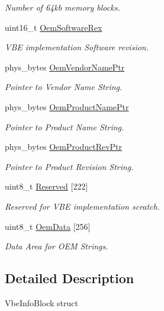 \begin{DoxyCompactItemize}
\begin{DoxyCompactList}\small\item\em Number of 64kb memory blocks. \end{DoxyCompactList}\item 
uint16\+\_\+t \hyperlink{structvbe__info__block__t_a050873b740536c3f9c9a9b0ecb76b497}{Oem\+Software\+Rex}
\begin{DoxyCompactList}\small\item\em V\+BE implementation Software revision. \end{DoxyCompactList}\item 
phys\+\_\+bytes \hyperlink{structvbe__info__block__t_affd3a330afde841405f89bbcd05af4f0}{Oem\+Vendor\+Name\+Ptr}
\begin{DoxyCompactList}\small\item\em Pointer to Vendor Name String. \end{DoxyCompactList}\item 
phys\+\_\+bytes \hyperlink{structvbe__info__block__t_afd3d28c2078a683b1ed64ea21905fcfe}{Oem\+Product\+Name\+Ptr}
\begin{DoxyCompactList}\small\item\em Pointer to Product Name String. \end{DoxyCompactList}\item 
phys\+\_\+bytes \hyperlink{structvbe__info__block__t_a239cba41d0489da5b79556b45797c6b0}{Oem\+Product\+Rev\+Ptr}
\begin{DoxyCompactList}\small\item\em Pointer to Product Revision String. \end{DoxyCompactList}\item 
uint8\+\_\+t \hyperlink{structvbe__info__block__t_a2c3b1cbb6bad5c51d4be4e57255a61d2}{Reserved} \mbox{[}222\mbox{]}
\begin{DoxyCompactList}\small\item\em Reserved for V\+BE implementation scratch. \end{DoxyCompactList}\item 
uint8\+\_\+t \hyperlink{structvbe__info__block__t_a966ae75c33c2d65b4f0c916f093acac0}{Oem\+Data} \mbox{[}256\mbox{]}
\begin{DoxyCompactList}\small\item\em Data Area for O\+EM Strings. \end{DoxyCompactList}\end{DoxyCompactItemize}


\subsection{Detailed Description}
Vbe\+Info\+Block struct 

